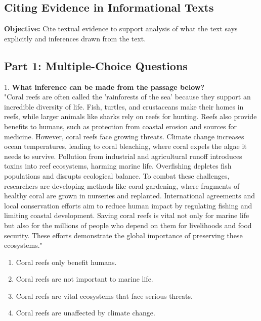 \documentclass[12pt]{article}
\begin{document}
\subsection*{Citing Evidence in Informational Texts}
\onehalfspacing

\begin{tcolorbox}[colframe=black!40, colback=gray!0, title=Learning Objective]
\textbf{Objective:} Cite textual evidence to support analysis of what the text says explicitly and inferences drawn from the text.
\end{tcolorbox}

\subsection*{Part 1: Multiple-Choice Questions}

1. \textbf{What inference can be made from the passage below?\\}
"Coral reefs are often called the 'rainforests of the sea' because they support an incredible diversity of life. Fish, turtles, and crustaceans make their homes in reefs, while larger animals like sharks rely on reefs for hunting. Reefs also provide benefits to humans, such as protection from coastal erosion and sources for medicine. However, coral reefs face growing threats. Climate change increases ocean temperatures, leading to coral bleaching, where coral expels the algae it needs to survive. Pollution from industrial and agricultural runoff introduces toxins into reef ecosystems, harming marine life. Overfishing depletes fish populations and disrupts ecological balance. To combat these challenges, researchers are developing methods like coral gardening, where fragments of healthy coral are grown in nurseries and replanted. International agreements and local conservation efforts aim to reduce human impact by regulating fishing and limiting coastal development. Saving coral reefs is vital not only for marine life but also for the millions of people who depend on them for livelihoods and food security. These efforts demonstrate the global importance of preserving these ecosystems."  
\begin{enumerate}[label=\Alph*.]
    \item Coral reefs only benefit humans.  
    \item Coral reefs are not important to marine life.  
    \item Coral reefs are vital ecosystems that face serious threats.  
    \item Coral reefs are unaffected by climate change.  
\end{enumerate}
\end{document}
